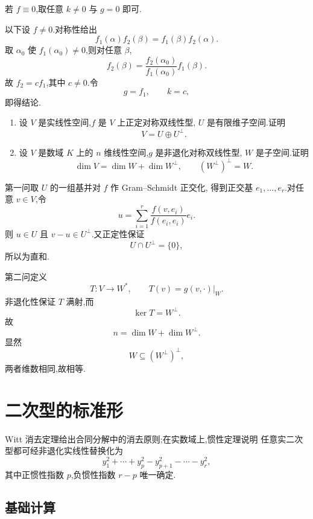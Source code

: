 \begin{solution}
若 $f\equiv0$,取任意 $k\neq0$ 与 $g=0$ 即可.

以下设 $f\neq0$.对称性给出
\[
f_1(\alpha)f_2(\beta)
=
f_1(\beta)f_2(\alpha).
\]
取 $\alpha_0$ 使 $f_1(\alpha_0)\neq0$,则对任意 $\beta$,
\[
f_2(\beta)
=
\dfrac{f_2(\alpha_0)}{f_1(\alpha_0)}f_1(\beta).
\]
故 $f_2=c f_1$,其中 $c\neq0$.令
\[
g=f_1,\qquad k=c,
\]
即得结论.
\end{solution}


\begin{example}
\begin{enumerate}
    \item 设 $V$ 是实线性空间,$f$ 是 $V$ 上正定对称双线性型,
    $U$ 是有限维子空间.证明
    \[
    V=U\oplus U^\perp.
    \]
    \item 设 $V$ 是数域 $K$ 上的 $n$ 维线性空间,$g$ 是非退化对称双线性型,
    $W$ 是子空间.证明
    \[
    \dim V=\dim W+\dim W^\perp,
    \qquad
    (W^\perp)^\perp=W.
    \]
\end{enumerate}
\end{example}
\exampleblank

\begin{solution}
第一问取 $U$ 的一组基并对 $f$ 作 Gram--Schmidt 正交化,
得到正交基 $e_1,\ldots,e_r$.对任意 $v\in V$,令
\[
u=
\sum\limits_{i=1}^{r}
\dfrac{f(v,e_i)}{f(e_i,e_i)}e_i.
\]
则 $u\in U$ 且 $v-u\in U^\perp$.又正定性保证
\[
U\cap U^\perp=\{0\},
\]
所以为直和.

第二问定义
\[
T:V\to W^*,
\qquad
T(v)=g(v,\cdot)|_W.
\]
非退化性保证 $T$ 满射,而
\[
\ker T=W^\perp.
\]
故
\[
n=\dim W+\dim W^\perp.
\]
显然
\[
W\subseteq(W^\perp)^\perp,
\]
两者维数相同,故相等.
\end{solution}


\newpage

\section{二次型的标准形}

\begin{theorem}[\markstar]
Witt 消去定理给出合同分解中的消去原则;在实数域上,惯性定理说明
任意实二次型都可经非退化实线性替换化为
\[
y_1^2+\cdots+y_p^2-y_{p+1}^2-\cdots-y_r^2,
\]
其中正惯性指数 $p$,负惯性指数 $r-p$ 唯一确定.
\end{theorem}


\subsection{基础计算}

